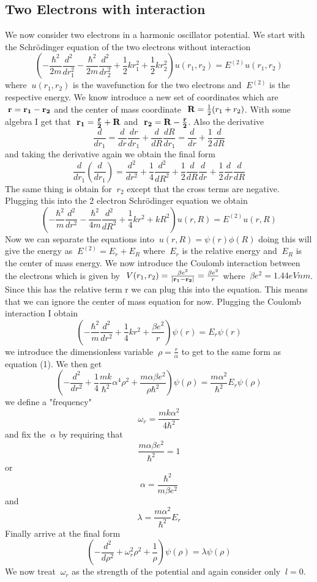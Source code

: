 \documentclass[11pt,a4wide]{article}
\begin{document}
\subsection{Two Electrons with interaction}
We now consider two electrons in a harmonic oscillator potential. We start with the Schr\"odinger equation of the two electrons without interaction 
\[
	\left(-\frac{\hbar^2}{2m}\frac{d^2}{dr^2_1} -\frac{\hbar^2}{2m}\frac{d^2}{dr^2_2} + \frac{1}{2}kr^2_1 +\frac{1}{2}kr^2_2\right)u(r_1,r_2) = E^{(2)}u(r_1,r_2)
\]
where $\ u(r_1,r_2)$ is the wavefunction for the two electrons and $\ E^(2)$ is the respective energy. We know introduce a new set of coordinates which are $\ {\bf r }={\bf r_1 -r_2}$ and the center of mass coordinate $\ {\bf R}= \frac{1}{2}(r_1 +r_2)$. With some algebra I get that $\ {\bf r_1}={\bf \frac{r}{2} +R}$ and $\ {\bf r_2}={\bf R - \frac{r}{2}}$. Also the derivative 
\[
	\frac{d}{dr_1}= \frac{d}{dr}\frac{dr}{dr_1}+ \frac{d}{dR}\frac{dR}{dr_1}= \frac{d}{dr} +\frac{1}{2}\frac{d}{dR}
\]
and taking the derivative again we obtain the final form
\[
	\frac{d}{dr_1}\left(\frac{d}{dr_1}\right)=\frac{d^2}{dr^2} +\frac{1}{4}\frac{d^2}{dR^2} + \frac{1}{2}\frac{d}{dR}\frac{d}{dr} +\frac{1}{2}\frac{d}{dr}\frac{d}{dR}
\]
The same thing is obtain for $\ r_2 $ except that the cross terms are negative. Plugging this into the 2 electron Schr\"odinger equation we obtain
\[
	\left(-\frac{\hbar^2}{m}\frac{d^2}{dr^2} -\frac{\hbar^2}{4m}\frac{d^2}{dR^2} + \frac{1}{4}kr^2 + kR^2\right)u(r,R) = E^{(2)}u(r,R)
\]
Now we can separate the equations into $\ u(r,R)=\psi(r)\phi(R)$ doing this will give the energy as $\ E^{(2)} = E_r + E_R$ where 
$\ E_r$ is the relative energy and $\ E_R$ is the center of mass energy. We now introduce the Coulomb interaction between the electrons which is given by $\ V(r_1,r_2)= \frac{\beta e^2}{|{\bf r_1 -r_2|}}=\frac{\beta e^2}{r}$ where $\ \beta e^2=1.44eVnm$. Since this has the relative term r we can plug this into the equation. This means that we can ignore the center of mass equation for now. Plugging the Coulomb interaction I obtain 
\[
	\left(-\frac{\hbar^2}{m}\frac{d^2}{dr^2} +\frac{1}{4}kr^2 +\frac{\beta e^2}{r}\right)\psi(r) =E_r\psi(r)
\] 
we introduce the dimensionless variable $\ \rho=\frac{r}{\alpha}$ to get to the same form as equation (1). We then get
\begin{equation}
  \left(-\frac{d^2}{dr^2} + \frac{1}{4} \frac{mk}{\hbar^2} \alpha^4 \rho^2 + \frac{m \alpha \beta e^2}{\rho \hbar^2} \right)\psi (\rho)= \frac{m \alpha^2}{\hbar^2} E_r \psi(\rho)
\end{equation} 
we define a "frequency"
\[
	\omega_r = \frac{mk \alpha^2}{4 \hbar^2}
\]
and fix the $\ \alpha$ by requiring that 
\[
	\frac{m \alpha \beta e^2}{\hbar^2}=1
\]
or
\[
	\alpha =\frac{\hbar^2}{m \beta e^2}
\]
and 
\[
	\lambda = \frac{m\alpha^2}{\hbar^2}E_r
\]
Finally arrive at the final form
\begin{equation}
	\left(-\frac{d^2}{d\rho^2} + \omega^2_r \rho^2 + \frac{1}{\rho} \right) \psi(\rho) = \lambda \psi(\rho)
\end{equation}
We now treat $\ \omega_r $ as the strength of the potential and again consider only $\ l=0$. 
\end{document}
